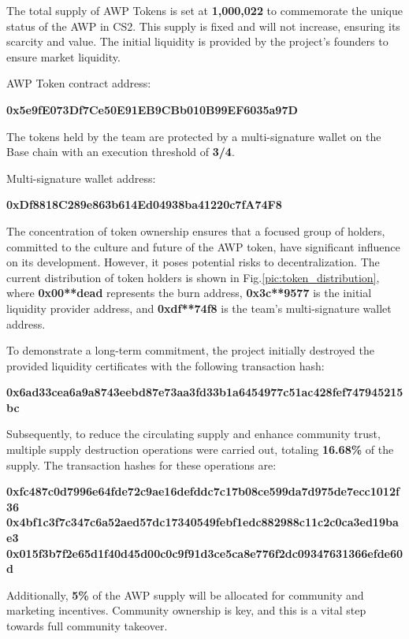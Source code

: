 \documentclass[journal,onecolumn,]{IEEEtran}
\begin{document}
	The total supply of AWP Tokens is set at \textbf{1,000,022} to commemorate the unique status of the AWP in CS2. This supply is fixed and will not increase, ensuring its scarcity and value. The initial liquidity is provided by the project's founders to ensure market liquidity.
	
	AWP Token contract address:
	\begin{center}
		\textbf{0x5e9fE073Df7Ce50E91EB9CBb010B99EF6035a97D}
	\end{center}
	
	The tokens held by the team are protected by a multi-signature wallet on the Base chain with an execution threshold of \textbf{3/4}.
	
	Multi-signature wallet address:
	\begin{center}
		\textbf{0xDf8818C289e863b614Ed04938ba41220c7fA74F8}
	\end{center}
	
	The concentration of token ownership ensures that a focused group of holders, committed to the culture and future of the AWP token, have significant influence on its development. However, it poses potential risks to decentralization. The current distribution of token holders is shown in Fig.\ref{pic:token_distribution}, where \textbf{0x00**dead} represents the burn address, \textbf{0x3c**9577} is the initial liquidity provider address, and \textbf{0xdf**74f8} is the team's multi-signature wallet address.
	
	To demonstrate a long-term commitment, the project initially destroyed the provided liquidity certificates with the following transaction hash:
	\begin{center}
		\textbf{0x6ad33cea6a9a8743eebd87e73aa3fd33b1a6454977c51ac428fef747945215bc}
	\end{center}
	
	Subsequently, to reduce the circulating supply and enhance community trust, multiple supply destruction operations were carried out, totaling \textbf{16.68\%} of the supply. The transaction hashes for these operations are:
	\begin{center}
		\textbf{0xfc487c0d7996e64fde72c9ae16defddc7c17b08ce599da7d975de7ecc1012f36}
		\textbf{0x4bf1c3f7c347c6a52aed57dc17340549febf1edc882988c11c2c0ca3ed19bae3}
		\textbf{0x015f3b7f2e65d1f40d45d00c0c9f91d3ce5ca8e776f2dc09347631366efde60d}
	\end{center}
	
	Additionally, \textbf{5\%} of the AWP supply will be allocated for community and marketing incentives. Community ownership is key, and this is a vital step towards full community takeover.
	
\end{document}
